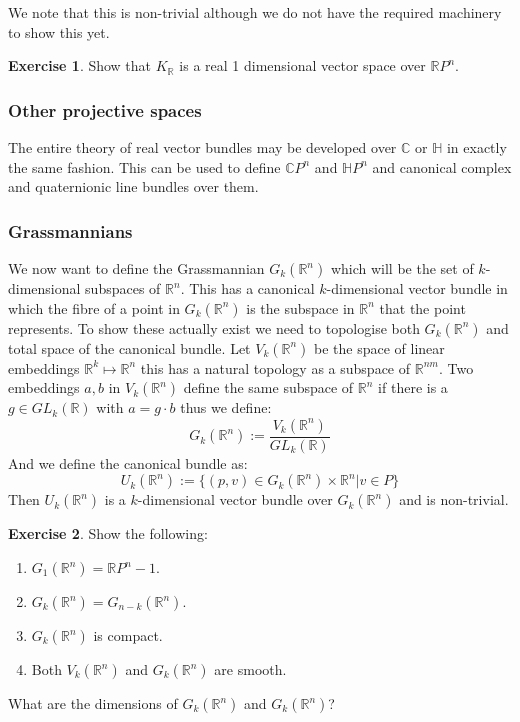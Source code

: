 \documentclass[a4paper,10pt]{article}
\theoremstyle{plain}%
\theoremstyle{definition}
\newtheorem{exer}{Exercise}
\theoremstyle{remark}
\newcommand{\RR}{\mathbb{R}}
\newcommand{\CC}{\mathbb{C}}
\newcommand{\HH}{\mathbb{H}}
\begin{document}
We note that this is non-trivial although we do not have the required machinery to show this yet.

\begin{exer}
 Show that $K_\RR$ is a real 1 dimensional vector space over $\RR P^n$.
\end{exer}


\subsubsection{Other projective spaces}

The entire theory of real vector bundles may be developed over $\CC$ or $\HH$ in exactly the same fashion. This can
be used to define $\CC P^n$ and $\HH P^n$ and canonical complex and quaternionic line bundles over them.

\subsubsection{Grassmannians}

We now want to define the Grassmannian $G_k(\RR^n)$ which will be the set of $k$-dimensional subspaces of $\RR^n$.
This has a canonical $k$-dimensional vector bundle in which the fibre of a point in $G_k(\RR^n)$ is the subspace 
in $\RR^n$ that the point represents. 
To show these actually exist we need to topologise both $G_k(\RR^n)$ and total space of the canonical bundle.
Let $V_k(\RR^n)$ be the space of linear embeddings $\RR^k\mapsto \RR^n$ this has a natural topology as a subspace of
$\RR^{n m}$. Two embeddings $a,b$ in $V_k(\RR^n)$ define the same subspace of $\RR^n$ if there is a $g\in GL_k(\RR)$
with $a=g\cdot b$ thus we define:
$$G_k(\RR^n):=\frac{V_k(\RR^n)}{GL_k(\RR)}$$
And we define the canonical bundle as:
$$U_k(\RR^n):=\{(p,v)\in G_k(\RR^n)\times \RR^n | v\in P\}$$
Then $U_k(\RR^n)$ is a $k$-dimensional vector bundle over $G_k(\RR^n)$ and is non-trivial.

\begin{exer}
Show the following:
 \begin{enumerate}
  \item $G_1(\RR^n)=\RR P^n-1$.
  \item $G_k(\RR^n) = G_{n-k}(\RR^n)$.
  \item $G_k(\RR^n)$ is compact.
  \item Both $V_k(\RR^n)$ and $G_k(\RR^n)$ are smooth.
 \end{enumerate}
What are the dimensions of $G_k(\RR^n)$ and $G_k(\RR^n)$?
\end{exer}
\end{document}

